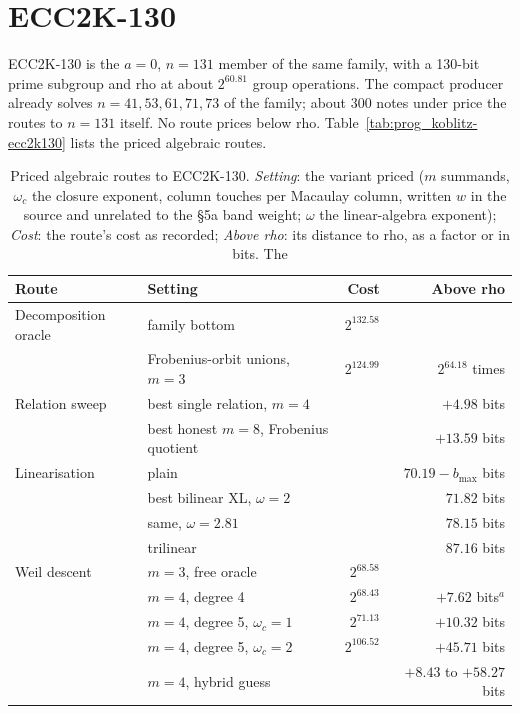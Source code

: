 \section{ECC2K-130}\label{sec:ecc2k130}

ECC2K-130 is the $a=0$, $n=131$ member of the same family, with a 130-bit
prime subgroup and rho at about $2^{60.81}$ group operations. The compact
producer already solves $n=41,53,61,71,73$ of the family; about 300 notes
under  price the routes to $n=131$ itself. No
route prices below rho.
Table~\ref{tab:prog_koblitz-ecc2k130} lists the priced algebraic routes.

\begin{table}[t]
\centering\small
\begin{tabular}{@{}llrr@{}}
\toprule
Route & Setting & Cost & Above rho \\
\midrule
Decomposition oracle & family bottom & $2^{132.58}$ & \\
 & Frobenius-orbit unions, $m=3$ & $2^{124.99}$ & $2^{64.18}$ times \\
\addlinespace
Relation sweep & best single relation, $m=4$ & & $+4.98$ bits \\
 & best honest $m=8$, Frobenius quotient & & $+13.59$ bits \\
\addlinespace
Linearisation & plain & & $70.19-b_{\max}$ bits \\
 & best bilinear XL, $\omega=2$ & & $71.82$ bits \\
 & same, $\omega=2.81$ & & $78.15$ bits \\
 & trilinear & & $87.16$ bits \\
\addlinespace
Weil descent & $m=3$, free oracle & $2^{68.58}$ & \\
 & $m=4$, degree 4 & $2^{68.43}$ & $+7.62$ bits$^{a}$ \\
 & $m=4$, degree 5, $\omega_c=1$ & $2^{71.13}$ & $+10.32$ bits \\
 & $m=4$, degree 5, $\omega_c=2$ & $2^{106.52}$ & $+45.71$ bits \\
 & $m=4$, hybrid guess & & $+8.43$ to $+58.27$ bits \\
\bottomrule
\end{tabular}
\caption[]{Priced algebraic routes to ECC2K-130. \emph{Setting}: the
variant priced ($m$ summands, $\omega_c$ the closure exponent, column
touches per Macaulay column, written $w$ in the source and unrelated to the
\S5a band weight; $\omega$ the
linear-algebra exponent); \emph{Cost}: the route's cost as recorded;
\emph{Above rho}: its distance to rho, as a factor or in bits. The
}
\end{table}
